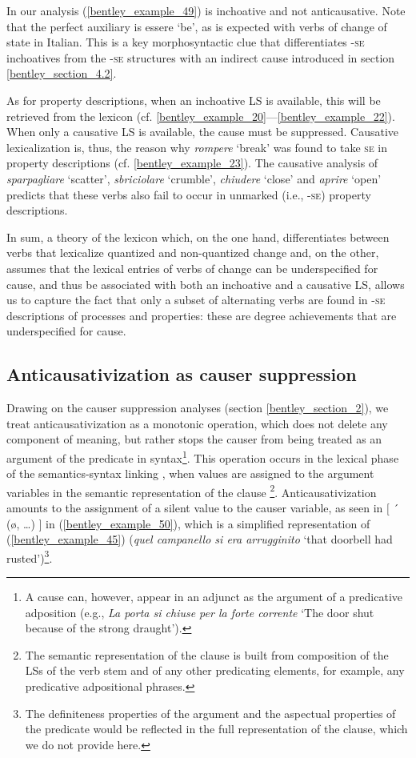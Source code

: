 \documentclass[output=paper,colorlinks,citecolor=brown
]{langscibook}
\begin{document}
In our analysis (\ref{bentley_example_49}) is inchoative and not anticausative. Note that the perfect auxiliary is essere ‘be’, as is expected with verbs of change of state in Italian. This is a key morphosyntactic clue that differentiates -\textsc{se} inchoatives from the -\textsc{se} structures with an indirect cause introduced in section \ref{bentley_section_4.2}. 

As for property descriptions, when an inchoative LS is available, this will be retrieved from the
lexicon (cf. \ref{bentley_example_20}—\ref{bentley_example_22}). When only a causative LS is available, the cause must be suppressed. Causative lexicalization is, thus, the reason why \textit{rompere} ‘break’ was found to take \textsc{se} in property descriptions (cf. \ref{bentley_example_23}). The causative analysis of \textit{sparpagliare} ‘scatter’, \textit{sbriciolare} ‘crumble’, \textit{chiudere} ‘close’ and \textit{aprire} ‘open’ predicts that these verbs also fail to occur in unmarked (i.e., -\textsc{se}) property descriptions.

In sum, a theory of the lexicon which, on the one hand, differentiates between verbs that lexicalize quantized and non-quantized change and, on the other, assumes that the lexical entries of verbs of change can be underspecified for cause, and thus be associated with both an inchoative and a causative LS, allows us to capture the fact that only a subset of alternating verbs are found in -\textsc{se} descriptions of processes and properties: these are degree achievements that are underspecified for cause.

\subsection{Anticausativization as causer suppression}
\label{bentley_section_5.4}

Drawing on the causer suppression analyses (section \ref{bentley_section_2}), we treat anticausativization as a monotonic
operation, which does not delete any component of meaning, but rather stops the causer from being
treated as an argument of the predicate in syntax\footnote{A cause can, however, appear in an
  adjunct as the argument of a predicative adposition (e.g., \textit{La porta si chiuse per la forte
    corrente} ‘The door shut because of the strong draught’). }.  This operation occurs in the
lexical phase of the semantics-syntax linking \citep[116—125]{vanvalin2023principles}, when values
are assigned to the argument variables in the semantic representation of the clause \footnote{The
  semantic representation of the clause is built from composition of the LSs of the verb stem and of
  any other predicating elements, for example, any predicative adpositional
  phrases.}. Anticausativization amounts to the assignment of a silent value to the causer variable,
as seen in $\lbrack$ ´ (\o,  \ldots ) $\rbrack$ in (\ref{bentley_example_50}), which is a simplified representation of (\ref{bentley_example_45}) (\textit{quel campanello si era arrugginito} ‘that doorbell had rusted’)\footnote{The definiteness properties of the argument and the aspectual properties of the predicate would be reflected in the full representation of the clause, which we do not provide here.}.
\end{document}

